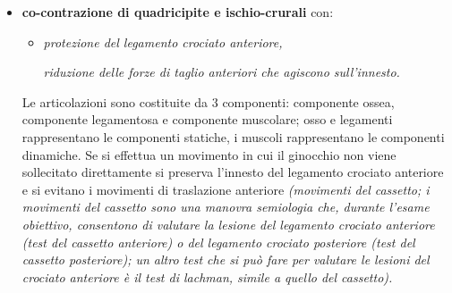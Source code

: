 \begin{itemize}
\item
  \textbf{co-contrazione di quadricipite e ischio-crurali} con:


\begin{itemize}
 
\item
  \emph{protezione del legamento crociato anteriore,}

  \emph{riduzione delle forze di taglio anteriori che agiscono
  sull'innesto.}
\end{itemize}

Le articolazioni sono costituite da 3 componenti: componente ossea,
componente legamentosa e componente muscolare; osso e legamenti
rappresentano le componenti statiche, i muscoli rappresentano le
componenti dinamiche. Se si effettua un movimento in cui il ginocchio
non viene sollecitato direttamente si preserva l'innesto del legamento
crociato anteriore e si evitano i movimenti di traslazione anteriore
\emph{(movimenti del cassetto; i movimenti del cassetto sono una manovra
semiologia che, durante l'esame obiettivo, consentono di valutare la
lesione del legamento crociato anteriore (test del cassetto anteriore) o
del legamento crociato posteriore (test del cassetto posteriore); un
altro test che si può fare per valutare le lesioni del crociato
anteriore è il test di lachman, simile a quello del cassetto).}


\end{itemize}
